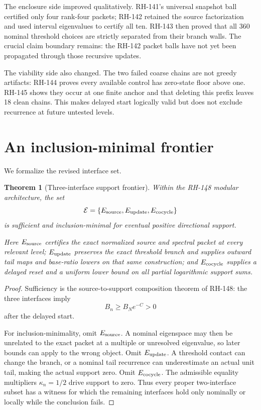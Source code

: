 \documentclass[12pt]{article}
\newtheorem{theorem}{Theorem}
\begin{document}
The enclosure side improved qualitatively.  RH-141's universal snapshot ball
certified only four rank-four packets; RH-142 retained the source factorization
and used interval eigenvalues to certify all ten.  RH-143 then proved that all
360 nominal threshold choices are strictly separated from their branch walls.
The crucial claim boundary remains: the RH-142 packet balls have not yet been
propagated through those recursive updates.

The viability side also changed.  The two failed coarse chains are not greedy
artifacts: RH-144 proves every available control has zero-state floor above
one.  RH-145 shows they occur at one finite anchor and that deleting this
prefix leaves 18 clean chains.  This makes delayed start logically valid but
does not exclude recurrence at future untested levels.

\section{An inclusion-minimal frontier}
We formalize the revised interface set.

\begin{theorem}[Three-interface support frontier]\label{thm:frontier}
Within the RH-148 modular architecture, the set
\[
 \mathcal E=\{E_{\rm source},E_{\rm update},E_{\rm cocycle}\}
\]
is sufficient and inclusion-minimal for eventual positive directional
support.

Here $E_{\rm source}$ certifies the exact normalized source and spectral
packet at every relevant level; $E_{\rm update}$ preserves the exact
threshold branch and supplies outward tail maps and base-ratio lowers on that
same construction; and $E_{\rm cocycle}$ supplies a delayed reset and a
uniform lower bound on all partial logarithmic support sums.
\end{theorem}
\begin{proof}
Sufficiency is the source-to-support composition theorem of RH-148: the three interfaces imply
\[
 B_n\geq B_Ne^{-C}>0
\]
after the delayed start.

For inclusion-minimality, omit $E_{\rm source}$.  A nominal eigenspace may
then be unrelated to the exact packet at a multiple or unresolved eigenvalue,
so later bounds can apply to the wrong object.  Omit $E_{\rm update}$.  A
threshold contact can change the branch, or a nominal tail recurrence can
underestimate an actual unit tail, making the actual support zero.  Omit
$E_{\rm cocycle}$.  The admissible equality multipliers
$\kappa_n=1/2$ drive support to zero.  Thus every proper two-interface subset
has a witness for which the remaining interfaces hold only nominally or
locally while the conclusion fails.
\end{proof}
\end{document}
